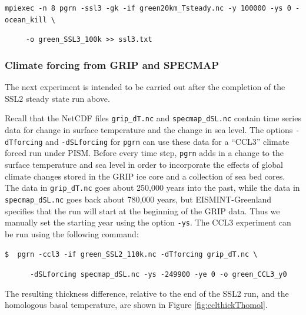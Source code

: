 \documentclass[11pt,final]{amsart}
\begin{document}
\verb|mpiexec -n 8 pgrn -ssl3 -gk -if green20km_Tsteady.nc -y 100000 -ys 0 -ocean_kill \|

\verb|     -o green_SSL3_100k >> ssl3.txt|


\subsubsection*{Climate forcing from GRIP and SPECMAP}  The next experiment is intended to be carried out after the completion of the SSL2 steady state run above.

Recall that the NetCDF files \verb|grip_dT.nc| and \verb|specmap_dSL.nc| contain time series data for change in surface temperature and the change in sea level.  The options \verb|-dTforcing| and \verb|-dSLforcing| for \verb|pgrn| can use these data for a ``CCL3'' climate forced run \cite{RitzEISMINT,HuybrechtsEISMINT} under PISM.  Before every time step, \verb|pgrn| adds in a change to the surface temperature and sea level in order to incorporate the effects of global climate changes stored in the GRIP ice core and a collection of sea bed cores.  The data in \verb|grip_dT.nc| goes about 250,000 years into the past, while the data in \verb|specmap_dSL.nc| goes back about 780,000 years, but EISMINT-Greenland specifies that the run will start at the beginning of the GRIP data.  Thus we manually set the starting year using the option \verb|-ys|.  The CCL3 experiment can be run using the following command:

\verb|$  pgrn -ccl3 -if green_SSL2_110k.nc -dTforcing grip_dT.nc \|

\verb|      -dSLforcing specmap_dSL.nc -ys -249900 -ye 0 -o green_CCL3_y0|

The resulting thickness difference, relative to the end of the SSL2 run, and the homologous basal temperature, are shown in Figure \ref{fig:cclthickThomol}.
\end{document}
